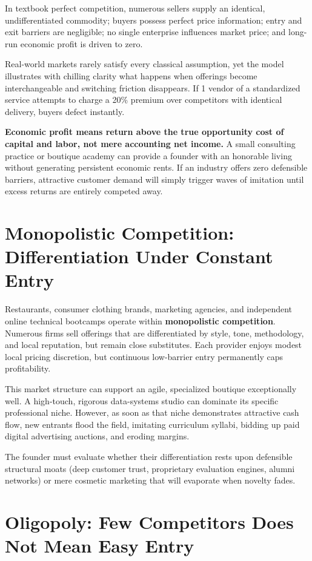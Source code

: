 In textbook perfect competition, numerous sellers supply an identical, undifferentiated commodity; buyers possess perfect price information; entry and exit barriers are negligible; no single enterprise influences market price; and long-run economic profit is driven to zero.

Real-world markets rarely satisfy every classical assumption, yet the model illustrates with chilling clarity what happens when offerings become interchangeable and switching friction disappears. If 1 vendor of a standardized service attempts to charge a 20\% premium over competitors with identical delivery, buyers defect instantly.

\textbf{Economic profit means return above the true opportunity cost of capital and labor, not mere accounting net income.} A small consulting practice or boutique academy can provide a founder with an honorable living without generating persistent economic rents. If an industry offers zero defensible barriers, attractive customer demand will simply trigger waves of imitation until excess returns are entirely competed away.

\section{Monopolistic Competition: Differentiation Under Constant Entry}

Restaurants, consumer clothing brands, marketing agencies, and independent online technical bootcamps operate within \textbf{monopolistic competition}. Numerous firms sell offerings that are differentiated by style, tone, methodology, and local reputation, but remain close substitutes. Each provider enjoys modest local pricing discretion, but continuous low-barrier entry permanently caps profitability.

This market structure can support an agile, specialized boutique exceptionally well. A high-touch, rigorous data-systems studio can dominate its specific professional niche. However, as soon as that niche demonstrates attractive cash flow, new entrants flood the field, imitating curriculum syllabi, bidding up paid digital advertising auctions, and eroding margins.

The founder must evaluate whether their differentiation rests upon defensible structural moats (deep customer trust, proprietary evaluation engines, alumni networks) or mere cosmetic marketing that will evaporate when novelty fades.

\section{Oligopoly: Few Competitors Does Not Mean Easy Entry}

